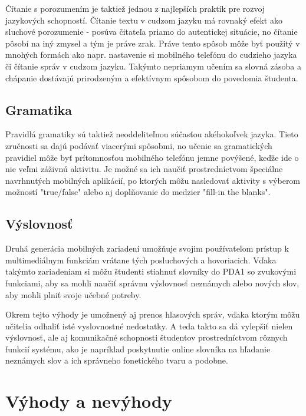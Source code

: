 \documentclass[10pt,oneside,slovak,a4paper]{article}
\begin{document}
Čítanie s porozumením je taktiež jednou z najlepších praktík pre rozvoj jazykových schopností. Čítanie textu v cudzom jazyku má rovnaký efekt ako sluchové porozumenie - posúva čitateľa priamo do autentickej situácie, no čítanie pôsobí na iný zmysel a tým je práve zrak. Práve tento spôsob môže byť použitý v mnohých formách ako napr. nastavenie si mobilného telefónu do cudzieho jazyka či čítanie správ v cudzom jazyku. Takýmto nepriamym učením sa slovná zásoba a chápanie dostávajú prirodzeným a efektívnym spôsobom do povedomia študenta.

\subsection{Gramatika} \label{mall:gramatika}

Pravidlá gramatiky sú taktiež neoddeliteľnou súčasťou akéhokoľvek jazyka. Tieto zručnosti sa dajú podávať viacerými spôsobmi, no učenie sa gramatických pravidiel môže byť prítomnosťou mobilného telefónu jemne povýšené, keďže ide o nie veľmi záživnú aktivitu. Je možné sa ich naučiť prostredníctvom špeciálne navrhnutých mobilných aplikácií, po ktorých môžu nasledovať aktivity s výberom možností "true/false" alebo aj doplňovanie do medzier "fill-in the blanks". 


\subsection{Výslovnosť} \label{mall:vyslovnost}

Druhá generácia mobilných zariadení umožňuje svojim používateľom prístup k multimediálnym funkciám vrátane tých posluchových a hovoriacich\cite{Miangah2012}. Vďaka takýmto zariadeniam si môžu študenti stiahnuť slovníky do PDA1 so zvukovými funkciami, aby sa mohli naučiť správnu výslovnosť neznámych alebo nových slov, aby mohli plniť svoje učebné potreby\cite{Miangah2012}.

Okrem tejto výhody je umožnený aj prenos hlasových správ, vďaka ktorým môžu učitelia odhaliť isté vyslovnostné nedostatky. A teda takto sa dá vylepšiť nielen výslovnosť, ale aj komunikačné schopnosti študentov prostredníctvom rôznych funkcií systému, ako je napríklad poskytnutie online slovníka na hľadanie neznámych slov a ich správneho fonetického tvaru a podobne\cite{Miangah2012}.


\section{Výhody a nevýhody} \label{vyhodyanevyhody}
\end{document}
